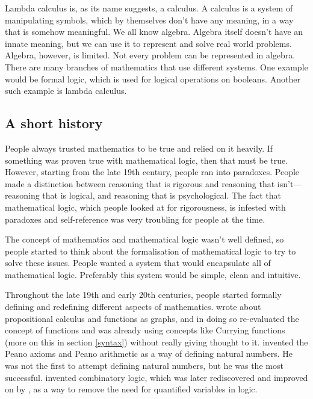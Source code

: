 \documentclass[11pt]{article}
\begin{document}
Lambda calculus is, as its name suggests, a calculus. A calculus is a system of
manipulating symbols, which by themselves don't have any meaning, in a way that
is somehow meaningful. We all know algebra. Algebra itself doesn't have an
innate meaning, but we can use it to represent and solve real world problems.
Algebra, however, is limited. Not every problem can be represented in algebra.
There are many branches of mathematics that use different systems. One example
would be formal logic, which is used for logical operations on booleans.
Another such example is lambda calculus.

\subsection{A short history\label{history}}

People always trusted mathematics to be true and relied on it heavily. If
something was proven true with mathematical logic, then that must be true.
However, starting from the late 19th century, people ran into paradoxes. People
made a distinction between reasoning that is rigorous and reasoning that
isn't---reasoning that is logical, and reasoning that is psychological. The
fact that mathematical logic, which people looked at for rigorousness, is
infested with paradoxes and self-reference was very troubling for people at the
time.

The concept of mathematics and mathematical logic wasn't well defined, so
people started to think about the formalisation of mathematical logic to try to
solve these issues. People wanted a system that would encapsulate all of
mathematical logic. Preferably this system would be simple, clean and
intuitive.

Throughout the late 19th and early 20th centuries, people started formally
defining and redefining different aspects of mathematics. \textcite{frege1879}
wrote about propositional calculus and functions as graphs, and in doing so
re-evaluated the concept of functions and was already using concepts like
Currying functions (more on this in section \ref{syntax}) without really giving
thought to it. \textcite{peano1889} invented the Peano axioms and Peano
arithmetic as a way of defining natural numbers. He was not the first to
attempt defining natural numbers, but he was the most successful.
\textcite{schonfinkel1924} invented combinatory logic, which was later
rediscovered and improved on by \textcite{curry1930}, as a way to remove the
need for quantified variables in logic.
\end{document}
